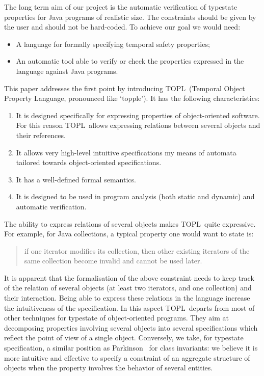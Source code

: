 \documentclass[preprint]{sigplanconf} %
\newcommand{\TPL}{TOPL}
\newcommand{\note}[2]{\textcolor{gray}{[\textcolor{red}{#1}: #2]}}
\newcommand{\rg}[1]{\note{rg}{#1}}
\theoremstyle{definition}
\theoremstyle{remark}
\begin{document}
The long term aim of our project is the automatic verification of typestate properties for Java programs of realistic size.
The constraints should be given by the user and should not be hard-coded.
To achieve our goal we would need:
\begin{itemize}
\item A language for formally specifying temporal safety properties;
\item An automatic tool able to verify or check the properties expressed in the language against Java programs.
\end{itemize}
This paper addresses the first point by introducing \TPL  \ (Temporal Object Property Language, pronounced like `topple').
It has the following characteristics:
\begin{enumerate}
\item It is designed specifically for expressing properties of object-oriented software. For this reason \TPL \ allows expressing relations between several objects and their references.
\item It allows very high-level intuitive specifications my means of automata tailored towards object-oriented specifications.
\item  It has a well-defined formal semantics.
\item  It is designed to be used in program analysis (both static and dynamic) and automatic verification.
\end{enumerate}
The ability to express relations of several objects makes  \TPL \ quite expressive. For example, for Java collections, a typical property one would want to state is:

\begin{quote}
if one iterator modifies its collection, then other existing iterators of the same collection become invalid and cannot be used later.
\end{quote}
\noindent 
It is apparent that the formalisation of the above constraint needs to keep track of the relation of several objects (at least two iterators, and one collection) and their interaction. Being able to express these relations in the language 
increase the intuitiveness of the specification.
In this aspect \TPL \ departs from most of other techniques for typestate of object-oriented programs. They aim at decomposing properties involving several objects into several specifications which reflect 
the point of view of a single object. Conversely,  we take, for typestate specification, a similar position as Parkinson~\cite{parkinson-iwaco2007} for class invariants: we believe it is more intuitive and effective to specify a constraint of 
an aggregate structure of objects when the property involves the behavior of  several entities.
   
\end{document}
